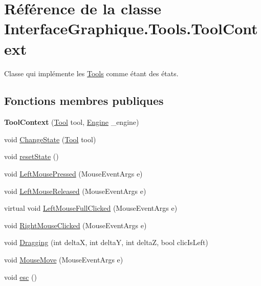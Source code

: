 \hypertarget{class_interface_graphique_1_1_tools_1_1_tool_context}{\section{Référence de la classe Interface\-Graphique.\-Tools.\-Tool\-Context}
\label{class_interface_graphique_1_1_tools_1_1_tool_context}
}


Classe qui implémente les \hyperlink{namespace_interface_graphique_1_1_tools}{Tools} comme étant des états.  


\subsection*{Fonctions membres publiques}
\begin{DoxyCompactItemize}
\item 
\hypertarget{class_interface_graphique_1_1_tools_1_1_tool_context_a32092c279ff4583cc9da0322d812bab8}{{\bfseries Tool\-Context} (\hyperlink{class_interface_graphique_1_1_tools_1_1_tool}{Tool} tool, \hyperlink{class_interface_graphique_1_1_engine}{Engine} \-\_\-engine)}\label{class_interface_graphique_1_1_tools_1_1_tool_context_a32092c279ff4583cc9da0322d812bab8}

\item 
void \hyperlink{class_interface_graphique_1_1_tools_1_1_tool_context_ade97797adf505d17e91a0b50ca8c5cf2}{Change\-State} (\hyperlink{class_interface_graphique_1_1_tools_1_1_tool}{Tool} tool)
\item 
void \hyperlink{class_interface_graphique_1_1_tools_1_1_tool_context_a8034bf986a46145bdc1ea020fda4df52}{reset\-State} ()
\item 
void \hyperlink{class_interface_graphique_1_1_tools_1_1_tool_context_a7ccfe5c95f9a2d36df97a5ca519f5f34}{Left\-Mouse\-Pressed} (Mouse\-Event\-Args e)
\item 
void \hyperlink{class_interface_graphique_1_1_tools_1_1_tool_context_ac57c92d2942edf74c36f017d1832f552}{Left\-Mouse\-Released} (Mouse\-Event\-Args e)
\item 
virtual void \hyperlink{class_interface_graphique_1_1_tools_1_1_tool_context_af5db46287ee0ac38e2fc409226fdbf4e}{Left\-Mouse\-Full\-Clicked} (Mouse\-Event\-Args e)
\item 
void \hyperlink{class_interface_graphique_1_1_tools_1_1_tool_context_a8aacce09581d7074fa196b65bf4bdd2a}{Right\-Mouse\-Clicked} (Mouse\-Event\-Args e)
\item 
void \hyperlink{class_interface_graphique_1_1_tools_1_1_tool_context_adf8f0e7bca71bcc71159558ea415a979}{Dragging} (int delta\-X, int delta\-Y, int delta\-Z, bool clic\-Is\-Left)
\item 
void \hyperlink{class_interface_graphique_1_1_tools_1_1_tool_context_abd1e936c04682a345bd45e345b8459ae}{Mouse\-Move} (Mouse\-Event\-Args e)
\item 
void \hyperlink{class_interface_graphique_1_1_tools_1_1_tool_context_a734a2f11bb0b7af1899407bcf02cfc2d}{esc} ()
\end{DoxyCompactItemize}
